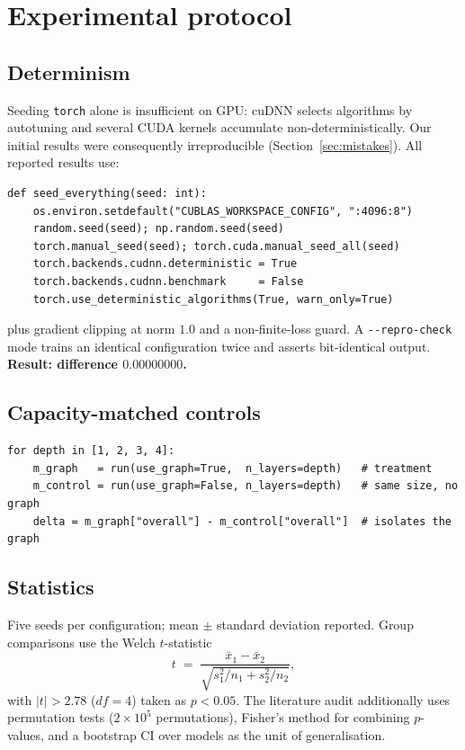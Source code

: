 \documentclass[11pt,a4paper]{article}
\begin{document}
\section{Experimental protocol}\label{sec:protocol}

\subsection{Determinism}
Seeding \texttt{torch} alone is insufficient on GPU: cuDNN selects algorithms by
autotuning and several CUDA kernels accumulate non-deterministically. Our
initial results were consequently irreproducible (Section~\ref{sec:mistakes}).
All reported results use:
\begin{lstlisting}
def seed_everything(seed: int):
    os.environ.setdefault("CUBLAS_WORKSPACE_CONFIG", ":4096:8")
    random.seed(seed); np.random.seed(seed)
    torch.manual_seed(seed); torch.cuda.manual_seed_all(seed)
    torch.backends.cudnn.deterministic = True
    torch.backends.cudnn.benchmark     = False
    torch.use_deterministic_algorithms(True, warn_only=True)
\end{lstlisting}
\noindent plus gradient clipping at norm $1.0$ and a non-finite-loss guard. A
\texttt{-{}-repro-check} mode trains an identical configuration twice and
asserts bit-identical output. \textbf{Result: difference $0.00000000$.}

\subsection{Capacity-matched controls}
\begin{lstlisting}
for depth in [1, 2, 3, 4]:
    m_graph   = run(use_graph=True,  n_layers=depth)   # treatment
    m_control = run(use_graph=False, n_layers=depth)   # same size, no graph
    delta = m_graph["overall"] - m_control["overall"]  # isolates the graph
\end{lstlisting}

\subsection{Statistics}
Five seeds per configuration; mean $\pm$ standard deviation reported. Group
comparisons use the Welch $t$-statistic
\begin{equation}
t \;=\; \frac{\bar{x}_1 - \bar{x}_2}{\sqrt{s_1^2/n_1 + s_2^2/n_2}},
\end{equation}
with $|t| > 2.78$ ($df = 4$) taken as $p < 0.05$. The literature audit
additionally uses permutation tests ($2\times10^5$ permutations), Fisher's
method for combining $p$-values, and a bootstrap CI over models as the unit of
generalisation.
\end{document}
